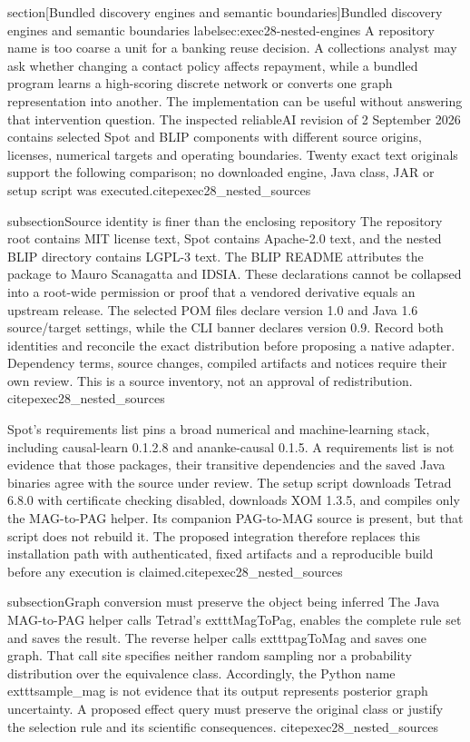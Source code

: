 section[Bundled discovery engines and semantic boundaries]{Bundled discovery engines and semantic boundaries}
label{sec:exec28-nested-engines}
A repository name is too coarse a unit for a banking reuse decision. A collections
analyst may ask whether changing a contact policy affects repayment, while a
bundled program learns a high-scoring discrete network or converts one graph
representation into another. The implementation can be useful without answering
that intervention question. The inspected reliableAI revision of 2 September
2026 contains selected Spot and BLIP components with different source origins,
licenses, numerical targets and operating boundaries. Twenty exact text originals
support the following comparison; no downloaded engine, Java class, JAR or setup
script was executed.citep{exec28_nested_sources}

subsection{Source identity is finer than the enclosing repository}
The repository root contains MIT license text, Spot contains Apache-2.0 text,
and the nested BLIP directory contains LGPL-3 text. The BLIP README attributes
the package to Mauro Scanagatta and IDSIA. These declarations cannot be collapsed
into a root-wide permission or proof that a vendored derivative equals an
upstream release. The selected POM files declare version 1.0 and Java 1.6
source/target settings, while the CLI banner declares version 0.9. Record both
identities and reconcile the exact distribution before proposing a native
adapter. Dependency terms, source changes, compiled artifacts and notices require
their own review. This is a source inventory, not an approval of redistribution.
citep{exec28_nested_sources}

Spot's requirements list pins a broad numerical and machine-learning stack,
including causal-learn 0.1.2.8 and ananke-causal 0.1.5. A requirements list is
not evidence that those packages, their transitive dependencies and the saved
Java binaries agree with the source under review. The setup script downloads
Tetrad 6.8.0 with certificate checking disabled, downloads XOM 1.3.5, and compiles
only the MAG-to-PAG helper. Its companion PAG-to-MAG source is present, but that
script does not rebuild it. The proposed integration therefore replaces this
installation path with authenticated, fixed artifacts and a reproducible build
before any execution is claimed.citep{exec28_nested_sources}

subsection{Graph conversion must preserve the object being inferred}
The Java MAG-to-PAG helper calls Tetrad's 	exttt{MagToPag}, enables the complete
rule set and saves the result. The reverse helper calls 	exttt{pagToMag} and
saves one graph. That call site specifies neither random sampling nor a
probability distribution over the equivalence class. Accordingly, the Python
name 	exttt{sample_mag} is not evidence that its output represents posterior
graph uncertainty. A proposed effect query must preserve the original class
or justify the selection rule and its scientific consequences.
citep{exec28_nested_sources}

